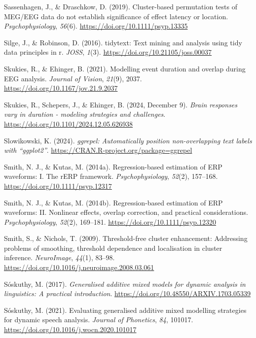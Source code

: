 \documentclass[
  man,
  floatsintext,
  longtable,
  a4paper,
  nolmodern,
  notxfonts,
  notimes,
  colorlinks=true,linkcolor=blue,citecolor=blue,urlcolor=blue]{apa7}
\newlength{\cslhangindent}
\newenvironment{CSLReferences}[2] %
 {\begin{list}{}{%
  \setlength{\itemindent}{0pt}
  \setlength{\leftmargin}{0pt}
  \setlength{\parsep}{0pt}
  \ifodd #1
   \setlength{\leftmargin}{\cslhangindent}
   \setlength{\itemindent}{-1\cslhangindent}
  \fi
  \setlength{\itemsep}{#2\baselineskip}}}
 {\end{list}}
\begin{document}
\begin{CSLReferences}{1}{0}
Sassenhagen, J., \& Draschkow, D. (2019). Cluster{-}based permutation
tests of MEG/EEG data do not establish significance of effect latency or
location. \emph{Psychophysiology}, \emph{56}(6).
\url{https://doi.org/10.1111/psyp.13335}

Silge, J., \& Robinson, D. (2016). {tidytext}: Text mining and analysis
using tidy data principles in r. \emph{JOSS}, \emph{1}(3).
\url{https://doi.org/10.21105/joss.00037}

Skukies, R., \& Ehinger, B. (2021). Modelling event duration and overlap
during {EEG} analysis. \emph{Journal of Vision}, \emph{21}(9), 2037.
\url{https://doi.org/10.1167/jov.21.9.2037}

Skukies, R., Schepers, J., \& Ehinger, B. (2024, December 9).
\emph{Brain responses vary in duration - modeling strategies and
challenges}. \url{https://doi.org/10.1101/2024.12.05.626938}

Slowikowski, K. (2024). \emph{{ggrepel}: Automatically position
non-overlapping text labels with {``{ggplot2}''}}.
\url{https://CRAN.R-project.org/package=ggrepel}

Smith, N. J., \& Kutas, M. (2014a). Regression{-}based estimation of ERP
waveforms: I. The rERP framework. \emph{Psychophysiology}, \emph{52}(2),
157--168. \url{https://doi.org/10.1111/psyp.12317}

Smith, N. J., \& Kutas, M. (2014b). Regression{-}based estimation of ERP
waveforms: II. Nonlinear effects, overlap correction, and practical
considerations. \emph{Psychophysiology}, \emph{52}(2), 169--181.
\url{https://doi.org/10.1111/psyp.12320}

Smith, S., \& Nichols, T. (2009). Threshold-free cluster enhancement:
Addressing problems of smoothing, threshold dependence and localisation
in cluster inference. \emph{NeuroImage}, \emph{44}(1), 83--98.
\url{https://doi.org/10.1016/j.neuroimage.2008.03.061}

Sóskuthy, M. (2017). \emph{Generalised additive mixed models for dynamic
analysis in linguistics: A practical introduction}.
\url{https://doi.org/10.48550/ARXIV.1703.05339}

Sóskuthy, M. (2021). Evaluating generalised additive mixed modelling
strategies for dynamic speech analysis. \emph{Journal of Phonetics},
\emph{84}, 101017. \url{https://doi.org/10.1016/j.wocn.2020.101017}


\end{CSLReferences}
\end{document}
